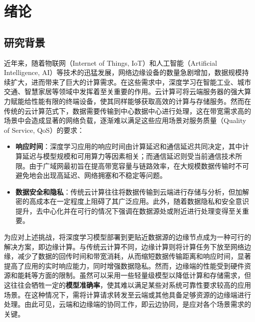 
\chapter{绪论}

\section{研究背景}

近年来，随着物联网（Internet of Things, IoT）和人工智能（Artificial Intelligence, AI）等技术的迅猛发展，网络边缘设备的数量急剧增加，数据规模持续扩大，进而带来了巨大的计算需求\cite{verma2017survey}。在这些需求中，深度学习在智能工业\cite{yan2017industrial,zhang2017self,peres2018idarts,mohamed2019leveraging}、城市交通\cite{jia2017edge,mohamed2017smartcityware,mallapuram2017smart,dalla2017using}、智慧家居\cite{savio2018smart,krejcar2020technology,黄倩怡2020智能家居中的边缘计算}等领域中发挥着至关重要的作用。云计算可将云端服务器的强大算力赋能给性能有限的终端设备，使其同样能够获取高效的计算与存储服务\cite{shafi20175g}。然而在传统的云计算范式下，数据需要传输到中心数据中心进行处理，这在带宽需求高的场景中会造成显著的网络负载，逐渐难以满足这些应用场景对服务质量（Quality of Service, QoS）的要求\cite{wang2024end}：

\begin{itemize} 
\item \textbf{响应时间}：深度学习应用的响应时间由计算延迟和通信延迟共同决定，其中计算延迟与模型规模和可用算力等因素相关；而通信延迟则受当前通信技术所限。由于广域网最初旨在提高带宽容量与链路效率，在大规模数据传输时不可避免地会出现高延迟、网络拥塞和不稳定等问题。
\item \textbf{数据安全和隐私}：传统云计算往往将数据传输到云端进行存储与分析，但加解密的高成本在一定程度上阻碍了其广泛应用。此外，随着数据隐私和安全意识提升，去中心化并在可行的情况下强调在数据源处或附近进行处理变得至关重要。
\end{itemize}

为应对上述挑战，将深度学习模型部署到更贴近数据源的边缘节点成为一种可行的解决方案，即边缘计算。与传统云计算不同，边缘计算则将计算任务下放至网络边缘，减少了数据的回传时间和带宽消耗，从而缩短数据传输距离和响应时间，显著提高了应用的实时响应能力，同时增强数据隐私\cite{chowdhury2019co,khan2019edge,liu2019survey,施巍松2019边缘计算,刘通2021边缘计算中任务卸载研究综述}。然而，边缘端的性能受到硬件资源和能耗等方面的限制。虽然可以采用一些轻量级模型以降低计算和存储需求，但这往往会牺牲一定的\textbf{模型准确率}，使其难以满足某些对系统可靠性要求较高的应用场景。在这种情况下，需将计算请求转发至云端或其他具备足够资源的边缘端进行处理。由此可见，云端和边缘端的协同工作，即云边协同，是应对各个场景需求的关键。

